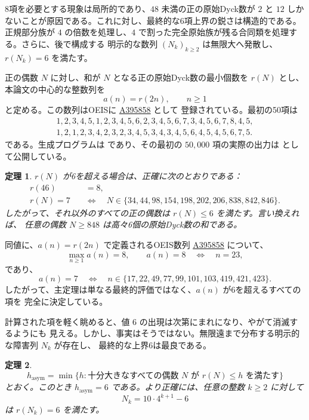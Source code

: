 \documentclass[12pt]{ltjsarticle}
\theoremstyle{plain}
\newtheorem{theorem}{定理}
\theoremstyle{definition}
\theoremstyle{plain}
\newcommand{\seqnum}[1]{\href{https://oeis.org/#1}{\textrm{\underline{#1}}}}
\begin{document}
8項を必要とする現象は局所的であり、$48$ 未満の正の原始Dyck数が $2$ と $12$ しか
ないことが原因である。これに対し、最終的な6項上界の鋭さは構造的である。正規部分族が
$4$ の倍数を処理し、$4$ で割った完全原始族が残る合同類を処理する。さらに、後で構成する
明示的な数列 $(N_k)_{k\geq2}$ は無限大へ発散し、$r(N_k)=6$ を満たす。

正の偶数 $N$ に対し、和が $N$ となる正の原始Dyck数の最小個数を $r(N)$ とし、
本論文の中心的な整数列を
\[
        a(n)=r(2n),\qquad n\geq1
\]
と定める。この数列はOEISに \seqnum{A395858} \cite{OEIS-A395858} として
登録されている。最初の50項は
\[
\begin{gathered}
1,2,3,4,5,1,2,3,4,5,6,2,3,4,5,6,7,3,4,5,6,7,8,4,5,\\
1,2,1,2,3,4,2,3,2,3,4,5,3,4,3,4,5,6,4,5,4,5,6,7,5.
\end{gathered}
\]
である。生成プログラムは
\href{https://github.com/growupkuriyama-hub/lean_cfg_project/blob/3525cfb/LeanCfgProject/PrimDyck/A395858.py}{}
であり、その最初の $50{,}000$ 項の実際の出力は
\href{https://github.com/growupkuriyama-hub/lean_cfg_project/blob/3525cfb/LeanCfgProject/PrimDyck/b395858.txt}{}
として公開している。

\begin{theorem}\label{thm:classification}
$r(N)$ が6を超える場合は、正確に次のとおりである：
\[
\begin{aligned}
 r(46)&=8,\\[4pt]
 r(N)=7\quad&\Longleftrightarrow\quad
 N\in\{34,44,98,154,198,202,206,838,842,846\}.
\end{aligned}
\]
したがって、それ以外のすべての正の偶数は $r(N)\leq6$ を満たす。言い換えれば、
任意の偶数 $N\geq848$ は高々6個の原始Dyck数の和である。
\end{theorem}

同値に、$a(n)=r(2n)$ で定義されるOEIS数列 \seqnum{A395858}
\cite{OEIS-A395858} について、
\[
        \max_{n\geq1}a(n)=8,
        \qquad
        a(n)=8\quad\Longleftrightarrow\quad n=23,
\]
であり、
\[
 a(n)=7
 \quad\Longleftrightarrow\quad
 n\in\{17,22,49,77,99,101,103,419,421,423\}.
\]
したがって、主定理は単なる最終的評価ではなく、$a(n)$ が6を超えるすべての項を
完全に決定している。

計算された項を軽く眺めると、値 $6$ の出現は次第にまれになり、やがて消滅するようにも
見える。しかし、事実はそうではない。無限遠まで分布する明示的な障害列 $N_k$ が存在し、
最終的な上界6は最良である。

\begin{theorem}\label{thm:asymptotic-order}
\[
 h_{\mathrm{asym}}
 =\min\{h:\text{十分大きなすべての偶数 }N\text{ が }r(N)\leq h\text{ を満たす}\}
\]
とおく。このとき $h_{\mathrm{asym}}=6$ である。より正確には、任意の整数
$k\geq2$ に対して
\[
 N_k=10\cdot4^{k+1}-6
\]
は $r(N_k)=6$ を満たす。
\end{theorem}
\end{document}
